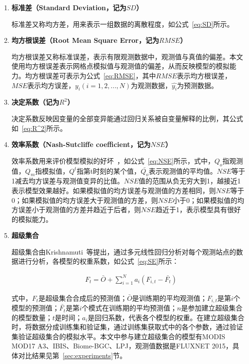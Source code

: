 \begin{enumerate}[(1)]
\item \textbf{标准差（Standard Deviation，记为$SD$）}

标准差又称均方差，用来表示一组数据的离散程度，如公式~\ref{eq:SD}所示。

\item \textbf{均方根误差（Root Mean Square Error，记为$RMSE$）}

均方根误差又称标准误差，表示有限观测数据中，观测值与真值的偏差。本文使用均方根误差表示网格点模拟值与观测值的偏差，从而反映模型的模拟能力。均方根误差可表示为公式~\ref{eq:RMSE}，其中$RMSE$表示均方根误差，$MSE$表示均方误差，$y_i(i=1,2,...,N)$为观测数据，$\hat{y_i}$为预测数据。

\item \textbf{决定系数（记为$R^2$）}

决定系数反映因变量的全部变异能通过回归关系被自变量解释的比例，其公式如~\ref{eq:R^2}所示。

\item \textbf{效率系数（Nash-Sutcliffe coefficient，记为$NSE$）}

效率系数用来评价模型模拟的好坏~\cite{gordon2003climate}，如公式~\ref{eq:NSE}所示，式中，$Q_o$指观测值，$Q_m$指模拟值，$Q^t$指第t时刻的某个值，$\bar{Q_o}$表示观测值的平均值。$NSE$等于1减去均方误差与观测值变异的比值。$NSE$值的范围从负无穷大到1，越接近1表示模型效果越好。如果模拟值的均方误差与观测值的方差相同，则$NSE$等于0；如果模拟值的均方误差大于观测值的方差，则$NSE$小于0；如果模拟值的均方误差小于观测值的方差并趋近于后者，则$NSE$趋近于1，表示模型具有很好的模拟能力。

\item \textbf{超级集合}

超级集合由Krishnamuti~\cite{krishnamurti1999improved}等提出，通过多元线性回归分析对每个观测站点的数据进行分析，各模型的权重系数，如公式~\ref{eq:SE}所示：

\begin{align}
    &F_t = \bar{O} + \sum\nolimits_{i=1}^{N}a_i\left(F_{i,t}-\bar{F_t}\right)
    \label{eq:SE}
\end{align}

式中，$F_t$是超级集合合成后的预测值；$\bar{O}$是训练期的平均观测值；$F_{i,t}$是第$i$个模型的预测值；$\bar{F_t}$是第$i$个模式在训练期的平均预测值；$n$是参加建立超级集合的模型数量；$t$是时间；$a_i$是回归系数，代表各个模型的权重。在建立超级集合时，将数据分成训练集和验证集，通过训练集获取式中的各个参数，通过验证集验证超级集合的模拟水平。本文中参与建立超级集合的模型有MODIS MOD17 A3、IBIS、Biome-BGC、LPJ，观测值数据是FLUXNET 2015，具体对比结果见第~\ref{sec:experiments}节。

\end{enumerate}

